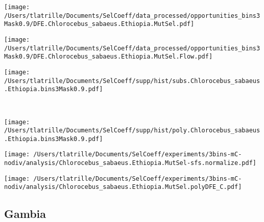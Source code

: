 \documentclass{article}
\begin{document}
    \begin{minipage}{0.32\linewidth}
        \texttt{[image: /Users/tlatrille/Documents/SelCoeff/data\_processed/opportunities\_bins3Mask0.9/DFE.Chlorocebus\_sabaeus.Ethiopia.MutSel.pdf]}
    \end{minipage}
    \begin{minipage}{0.32\linewidth}
        \texttt{[image: /Users/tlatrille/Documents/SelCoeff/data\_processed/opportunities\_bins3Mask0.9/DFE.Chlorocebus\_sabaeus.Ethiopia.MutSel.Flow.pdf]}
    \end{minipage}
    \begin{minipage}{0.32\linewidth}
        \texttt{[image: /Users/tlatrille/Documents/SelCoeff/supp/hist/subs.Chlorocebus\_sabaeus.Ethiopia.bins3Mask0.9.pdf]}
    \end{minipage}
    \\
    \begin{minipage}{0.32\linewidth}
        \texttt{[image: /Users/tlatrille/Documents/SelCoeff/supp/hist/poly.Chlorocebus\_sabaeus.Ethiopia.bins3Mask0.9.pdf]}
    \end{minipage}
    \begin{minipage}{0.32\linewidth}
        \texttt{[image: /Users/tlatrille/Documents/SelCoeff/experiments/3bins-mC-nodiv/analysis/Chlorocebus\_sabaeus.Ethiopia.MutSel-sfs.normalize.pdf]}
    \end{minipage}
    \begin{minipage}{0.32\linewidth}
        \texttt{[image: /Users/tlatrille/Documents/SelCoeff/experiments/3bins-mC-nodiv/analysis/Chlorocebus\_sabaeus.Ethiopia.MutSel.polyDFE\_C.pdf]}
    \end{minipage}
    \subsection{Gambia}
\end{document}
